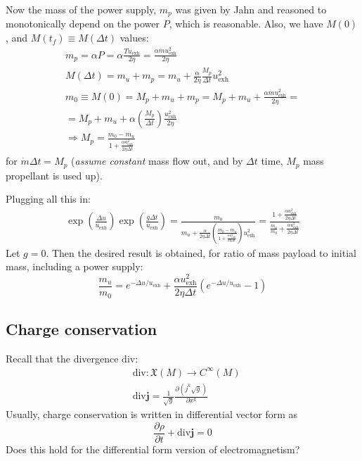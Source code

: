 \documentclass[10pt]{amsart}
\begin{document}
\begin{multicols*}{2}
Now the mass of the power supply, $m_p$ was given by Jahn and reasoned to monotonically depend on the power $P$, which is reasonable.  Also, we have $M(0)$, and $M(t_f) \equiv  M(\Delta t)$ values:
\[
\begin{gathered}
  m_p = \alpha P = \alpha \frac{ T u_{\text{exh}} }{ 2\eta} = \frac{ \alpha \dot{m} u^2_{\text{exh}} }{ 2 \eta} \\ 
  M(\Delta t) = m_u + m_p = m_u + \frac{ \alpha }{2\eta} \frac{M_p}{\Delta t} u^2_{\text{exh}} \\ 
  m_0 \equiv M(0) = M_p + m_u + m_p = M_p + m_u + \frac{ \alpha \dot{m} u^2_{\text{exh}} }{ 2\eta} = \\
  = M_p + m_u + \alpha \left( \frac{ M_p }{ \Delta t} \right) \frac{u^2_{\text{exh}} }{ 2\eta}  \\
  \Longrightarrow M_p = \frac{m_0 - m_u }{ 1 + \frac{ \alpha u^2_{\text{exh}} }{ 2\eta \Delta t} } 
\end{gathered}
\]
for $\dot{m}\Delta t = M_p$ (\emph{assume constant} mass flow out, and by $\Delta t$ time, $M_p$ mass propellant is used up).

Plugging all this in:
\[
\begin{gathered}
  \exp{ \left( \frac{ \Delta u}{ u_{\text{exh}} }\right) } \exp{ \left( \frac{ g\Delta t}{ u_{\text{exh}} } \right) } = \frac{m_0 }{ m_u + \frac{ \alpha}{2\eta \Delta t} \left( \frac{m_0 - m_u }{ 1 + \frac{ \alpha u^2_{\text{exh}} }{ 2 \eta \Delta t} } \right) u^2_{\text{exh}} } = \frac{ 1 + \frac{ \alpha u^2_{\text{exh} }}{ 2 \eta \Delta t} }{ \frac{m_u}{m_0} + \frac{ \alpha u^2_{\text{exh}} }{ 2\eta \Delta t} }
  \end{gathered}
\]
Let $g=0$.  Then the desired result is obtained, for ratio of mass payload to initial mass, including a power supply:
\begin{equation}
  \frac{m_u}{m_0} = e^{-\Delta u / u_{\text{exh}} } + \frac{ \alpha u_{\text{exh}}^2}{2\eta \Delta t} ( e^{ -\Delta u / u_{\text{exh}} } - 1 )
\end{equation}




\subsection{Charge conservation}

Recall that the divergence $\text{div}$:
\[
\begin{aligned}
  & \text{div}: \mathfrak{X}(M) \to C^{\infty}(M) \\
  & \text{div}\mathbf{j} = \frac{1}{\sqrt{g}} \frac{ \partial ( j^k \sqrt{g} ) }{ \partial x^k} 
\end{aligned}
\]
Usually, charge conservation is written in differential vector form as
\[
\frac{ \partial \rho }{ \partial t} + \text{div}\mathbf{j} = 0 
\]
Does this hold for the differential form version of electromagnetism?


\end{multicols*}
\end{document}
